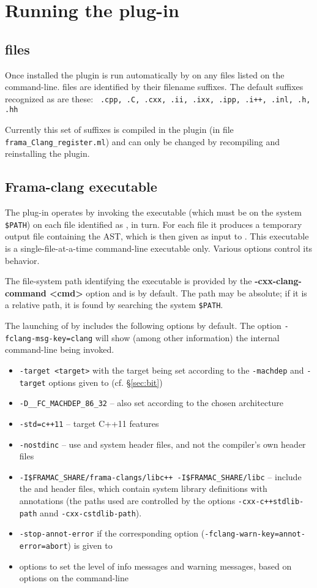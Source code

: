 \chapter{Running the plug-in}

\section{\cpp files}
Once installed the plugin is run automatically by \framac on any \cpp files listed on the command-line. \cpp files are identified by their filename suffixes. The default suffixes recognized as \cpp are these:
\lstinline| .cpp, .C, .cxx, .ii, .ixx, .ipp, .i++, .inl, .h, .hh|

Currently this set of suffixes is compiled in the plugin (in file \texttt{frama\_Clang\_register.ml}) and can only be changed by recompiling and
reinstalling the plugin.

\section{Frama-clang executable}
The plug-in operates by invoking the executable \irg (which must be on the system \verb|$PATH|)
on each file identified as \cpp, in turn. 
For each file it produces a temporary output file containing the \C AST, which is then given as input to \framac. 
This executable is a single-file-at-a-time command-line executable only. 
Various options control its behavior.

The file-system path identifying the executable is provided by the \textbf{-cxx-clang-command <cmd>}
option and is \irg by default. The path may be absolute; if it is a relative path, it is found by searching the system \verb|$PATH|.

The launching of \irg by \framac includes the following options by default. The \fc option \lstinline|-fclang-msg-key=clang| will show (among other information) the internal command-line being invoked.
\begin{itemize}
\item \verb|-target <target>| with the target being set according to the \lstinline|-machdep| and \lstinline|-target| options given to \framac (cf. \S\ref{sec:bit})
\item \verb|-D__FC_MACHDEP_86_32| -- also set according to the chosen architecture
\item \verb|-std=c++11| -- target C++11 features
\item \verb|-nostdinc| -- use \fcl and \framac system header files, and not the compiler's own header files
\item \verb|-I$FRAMAC_SHARE/frama-clangs/libc++ -I$FRAMAC_SHARE/libc| -- include the \fclang and \framac header files, which contain system library definitions with \acslpp annotations (the paths used are controlled by the \fc options \lstinline|-cxx-c++stdlib-path| annd \lstinline|-cxx-cstdlib-path|).
\item \verb|-stop-annot-error| if the corresponding option (\lstinline|-fclang-warn-key=annot-error=abort|) is given to \framac
\item options to set the level of info messages and warning messages, based on options on the \fc command-line
\end{itemize}

